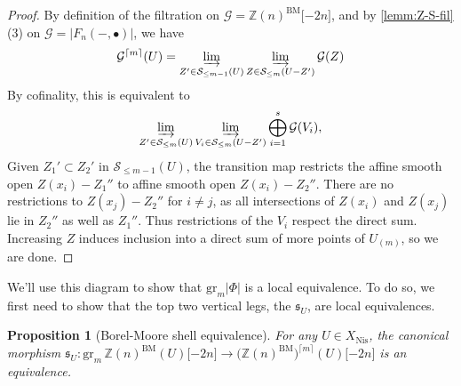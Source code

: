 \documentclass[11pt, twoside]{article}
\numberwithin{equation}{section}
\newtheorem{proposition}[equation]{Proposition}
\theoremstyle{definition}
\newcommand{\bb}[1]{\mathbb{#1}}
\newcommand{\colim}{\varinjlim}
\newcommand{\mf}[1]{\mathfrak{#1}}
\newcommand{\gr}{\mathrm{gr}}
\newcommand{\bm}{\mathrm{BM}}
\newcommand{\nis}{\mathrm{Nis}}
\begin{document}
\begin{proof}
By definition of the filtration on \(\mathcal{G} = \bb{Z}(n)^\bm \lbrack -2n \rbrack\), and by \ref{lemm:Z-S-fil} (3) on \(\mathcal{G} = |F_n( -, \bullet)|\), we have 
\[\mathcal{G}^{\lceil m \rceil}(U) = \colim_{Z' \in \mathcal{S}_{\leq m - 1}(U)} \colim_{Z \in \mathcal{S}_{\leq m}(U - Z')} \mathcal{G}(Z)\]
By cofinality, this is equivalent to  
\[\colim_{Z' \in \mathcal{S}_{\leq m}(U)} \colim_{V_i \in \mathcal{S}_{\leq m}(U - Z')} \bigoplus_{i = 1}^s \mathcal{G}(V_i),\]
Given \(Z_1' \subset Z_2'\) in \(\mathcal{S}_{\leq m - 1}(U)\), the transition map restricts the affine smooth open \(Z(x_i) - Z_1''\) to affine smooth open \(Z(x_i) - Z_2''\). There are no restrictions to \(Z(x_j) - Z_2''\) for \(i \neq j\), as all intersections of \(Z(x_i)\) and \(Z(x_j)\) lie in \(Z_2''\) as well as \(Z_1''\). Thus restrictions of the \(V_i\) respect the direct sum. Increasing \(Z\) induces inclusion into a direct sum of more points of \(U_{(m)}\), so we are done.
\end{proof}

We'll use this diagram to show that \(\gr_m |\Phi|\) is a local equivalence. To do so, we first need to show that the top two vertical legs, the \(\mf{s}_U\), are local equivalences.

\begin{proposition}[Borel-Moore shell equivalence]\label{prop-BM-shell}
For any \(U \in X_\nis\), the canonical morphism \(\mf{s}_U \colon \gr_m \, \bb{Z}(n)^\bm(U) \lbrack -2n \rbrack \to \big(\bb{Z}(n)^\bm)^{\lceil m \rceil}(U)\lbrack -2n \rbrack\) is an equivalence.
\end{proposition}
\end{document}
